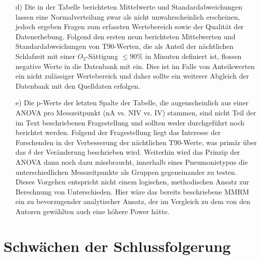 \documentclass{scrartcl}
\theoremstyle{definition}
\theoremstyle{remark}
\begin{document}
\begin{enumerate}
	\item[d) ]Die in der Tabelle berichteten Mittelwerte und Standardabweichungen lassen eine Normalverteilung zwar als nicht unwahrscheinlich erscheinen, jedoch ergeben Fragen zum erfassten Wertebereich sowie der Qualität der Datenerhebung. Folgend den ersten neun berichteten Mittelwerten und Standardabweichungen von T90-Werten, die als Anteil der nächtlichen Schlafzeit mit einer $O_2$-Sättigung $\le 90\%$ in Minuten definiert ist, flossen negative Werte in die Datenbank mit ein. Dies ist im Falle von Anteilswerten ein nicht zulässiger Wertebereich und daher sollte ein weiterer Abgleich der Datenbank mit den Quelldaten erfolgen.
	\item [e) ]Die p-Werte der letzten Spalte der Tabelle, die augenscheinlich aus einer ANOVA pro Messzeitpunkt (nA vs. NIV vs. IV) stammen, sind nicht Teil der im Text beschriebenen Fragestellung und sollten weder durchgeführt noch berichtet werden. Folgend der Fragestellung liegt das Interesse der Forschenden in der Verbesserung der nächtlichen T90-Werte, was primär über das $\delta$ der Veränderung beschrieben wird. Weiterhin wird das Prinzip der ANOVA dann noch dazu missbraucht, innerhalb eines Pneumonietypus die unterschiedlichen Messzeitpunkte als Gruppen gegeneinander zu testen. Dieses Vorgehen entspricht nicht einem logischen, methodischen Ansatz zur Berechnung von Unterschieden. Hier wäre das bereits beschriebene MMRM ein zu bevorzugender analytischer Ansatz, der im Vergleich zu dem von den Autoren gewählten auch eine höhere Power hätte.   
\end{enumerate}


\section{Schwächen der Schlussfolgerung}
\end{document}

